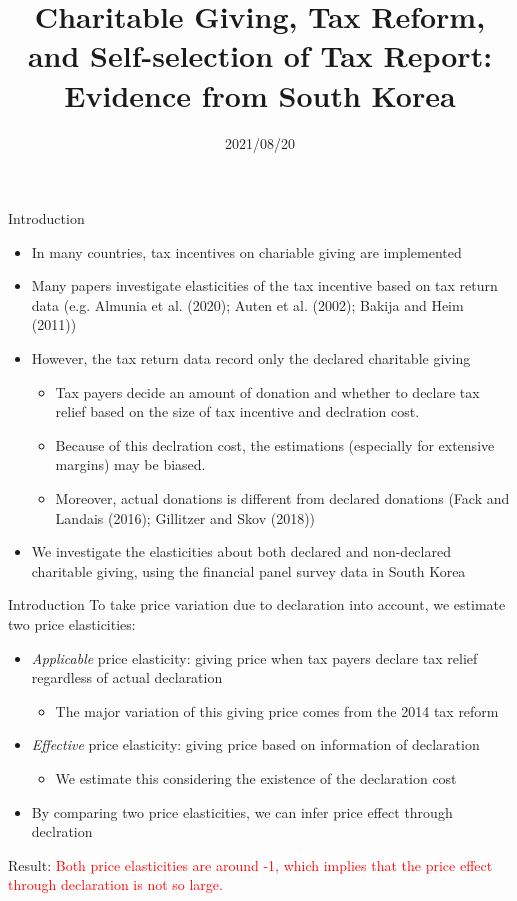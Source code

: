 \documentclass[
  ignorenonframetext,
  aspectratio=169,
]{beamer}
\title{Charitable Giving, Tax Reform, and Self-selection of Tax Report: Evidence from South Korea}
\author[shortname]{ Hiroki Kato \inst{1} \and  Tsuyoshi Goto \inst{2} \and  Yong-Rok Kim \inst{3} \and }
\institute[shortinst]{ \inst{1} Osaka University \and  \inst{2} Chiba University \and  \inst{3} Kobe University \and }
\date{2021/08/20}
\providecommand{\tightlist}{%
  \setlength{\itemsep}{0pt}\setlength{\parskip}{0pt}}
\begin{document}
\frame{\titlepage}

\begin{frame}{Introduction}
\protect\hypertarget{introduction}{}
\begin{itemize}
\tightlist
\item
  In many countries, tax incentives on chariable giving are implemented
\item
  Many papers investigate elasticities of the tax incentive based on tax return data (e.g. Almunia et al. (2020); Auten et al. (2002); Bakija and Heim (2011))
\item
  However, the tax return data record only the declared charitable giving

  \begin{itemize}
  \tightlist
  \item
    Tax payers decide an amount of donation and whether to declare tax relief based on the size of tax incentive and declration cost.
  \item
    Because of this declration cost, the estimations (especially for extensive margins) may be biased.
  \item
    Moreover, actual donations is different from declared donations (Fack and Landais (2016); Gillitzer and Skov (2018))
  \end{itemize}
\item
  We investigate the elasticities about both declared and non-declared charitable giving, using the financial panel survey data in South Korea
\end{itemize}
\end{frame}

\begin{frame}{Introduction}
\protect\hypertarget{introduction-1}{}
To take price variation due to declaration into account, we estimate two price elasticities:

\begin{itemize}
\tightlist
\item
  \emph{Applicable} price elasticity: giving price when tax payers declare tax relief regardless of actual declaration

  \begin{itemize}
  \tightlist
  \item
    The major variation of this giving price comes from the 2014 tax reform
  \end{itemize}
\item
  \emph{Effective} price elasticity: giving price based on information of declaration

  \begin{itemize}
  \tightlist
  \item
    We estimate this considering the existence of the declaration cost
  \end{itemize}
\item
  By comparing two price elasticities, we can infer price effect through declration
\end{itemize}

Result: \textcolor{red}{Both price elasticities are around -1, which implies that the price effect through declaration is not so large.}
\end{frame}
\end{document}
